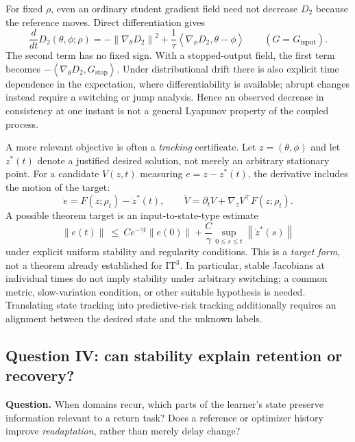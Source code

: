 \documentclass[11pt,a4paper]{article}
\newcommand{\norm}[1]{\left\lVert#1\right\rVert}
\newcommand{\ip}[2]{\left\langle#1,#2\right\rangle}
\begin{document}
For fixed $\rho$, even an ordinary student gradient field need not decrease $D_2$ because the reference moves. Direct differentiation gives
\begin{equation}
\frac{d}{dt}D_2(\theta,\phi;\rho)
=-\norm{\nabla_\theta D_2}^2
+\frac1\tau\ip{\nabla_\phi D_2}{\theta-\phi}
\qquad (G=G_{\mathrm{input}}).
\label{eq:Ddot}
\end{equation}
The second term has no fixed sign. With a stopped-output field, the first term becomes $-\ip{\nabla_\theta D_2}{G_{\mathrm{stop}}}$. Under distributional drift there is also explicit time dependence in the expectation, where differentiability is available; abrupt changes instead require a switching or jump analysis. Hence an observed decrease in consistency at one instant is not a general Lyapunov property of the coupled process.

A more relevant objective is often a \emph{tracking} certificate. Let $z=(\theta,\phi)$ and let $z^*(t)$ denote a justified desired solution, not merely an arbitrary stationary point. For a candidate $V(z,t)$ measuring $e=z-z^*(t)$, the derivative includes the motion of the target:
\begin{equation}
\dot e=F(z;\rho_t)-\dot z^*(t),\qquad
\dot V=\partial_tV+\nabla_zV^\top F(z;\rho_t).
\label{eq:tracking}
\end{equation}
A possible theorem target is an input-to-state-type estimate
\begin{equation}
\norm{e(t)}\ \leq\ C e^{-\gamma t}\norm{e(0)}
+\frac{C}{\gamma}\sup_{0\leq s\leq t}\norm{\dot z^*(s)}
\label{eq:trackbound}
\end{equation}
under explicit uniform stability and regularity conditions. This is a \emph{target form}, not a theorem already established for IT$^3$. In particular, stable Jacobians at individual times do not imply stability under arbitrary switching; a common metric, slow-variation condition, or other suitable hypothesis is needed. Translating state tracking into predictive-risk tracking additionally requires an alignment between the desired state and the unknown labels.

\subsection{Question IV: can stability explain retention or recovery?}
\textbf{Question.} When domains recur, which parts of the learner's state preserve information relevant to a return task? Does a reference or optimizer history improve \emph{readaptation}, rather than merely delay change?
\end{document}
